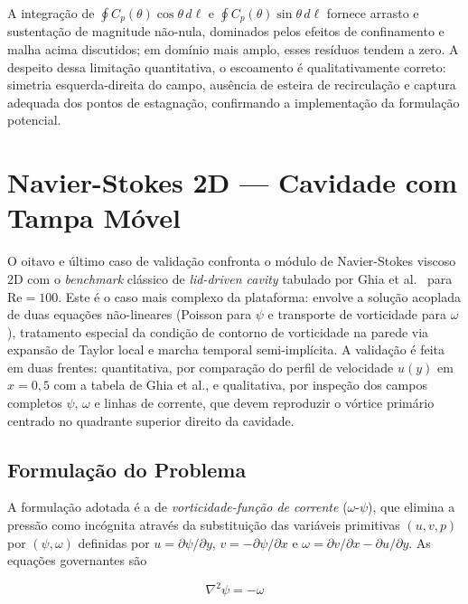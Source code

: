 A integração de $\oint C_p(\theta) \cos\theta \, d\ell$ e $\oint C_p(\theta) \sin\theta \, d\ell$ fornece arrasto e sustentação de magnitude não-nula, dominados pelos efeitos de confinamento e malha acima discutidos; em domínio mais amplo, esses resíduos tendem a zero. A despeito dessa limitação quantitativa, o escoamento é qualitativamente correto: simetria esquerda-direita do campo, ausência de esteira de recirculação e captura adequada dos pontos de estagnação, confirmando a implementação da formulação potencial.


\section{Navier-Stokes 2D --- Cavidade com Tampa Móvel}
\label{sec:val_ns}

O oitavo e último caso de validação confronta o módulo de Navier-Stokes viscoso 2D com o \emph{benchmark} clássico de \emph{lid-driven cavity} tabulado por Ghia et al.\ \cite{Ghia1982} para $\mathrm{Re} = 100$. Este é o caso mais complexo da plataforma: envolve a solução acoplada de duas equações não-lineares (Poisson para $\psi$ e transporte de vorticidade para $\omega$), tratamento especial da condição de contorno de vorticidade na parede via expansão de Taylor local e marcha temporal semi-implícita. A validação é feita em duas frentes: quantitativa, por comparação do perfil de velocidade $u(y)$ em $x = 0{,}5$ com a tabela de Ghia et al., e qualitativa, por inspeção dos campos completos $\psi$, $\omega$ e linhas de corrente, que devem reproduzir o vórtice primário centrado no quadrante superior direito da cavidade.

\subsection{Formulação do Problema}

A formulação adotada é a de \emph{vorticidade-função de corrente} ($\omega$-$\psi$), que elimina a pressão como incógnita através da substituição das variáveis primitivas $(u, v, p)$ por $(\psi, \omega)$ definidas por $u = \partial\psi/\partial y$, $v = -\partial\psi/\partial x$ e $\omega = \partial v/\partial x - \partial u/\partial y$. As equações governantes são

\begin{equation}
    \nabla^2 \psi = -\omega
    \label{eq:val_ns_poisson}
\end{equation}

